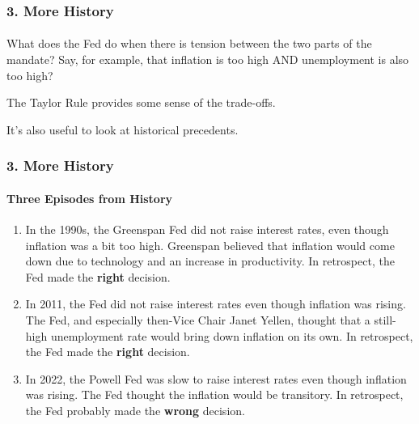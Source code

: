 \documentclass{beamer}
\begin{document}
\begin{frame}[t]
    \frametitle{3. More History}
    \framesubtitle{}

    What does the Fed do when there is tension between the two parts of the mandate?   Say, for example, that inflation is too high AND unemployment is also too high?  
    \vspace{1em}
    
    The Taylor Rule provides some sense of the trade-offs.
    \vspace{1em}
    
    It's also useful to look at historical precedents.

\end{frame}

\begin{frame}[t]
    \frametitle{3. More History}
    \framesubtitle{Three Episodes from History}

    \begin{enumerate}
        \item In the 1990s, the Greenspan Fed did not raise interest rates, even though inflation was a bit too high.   Greenspan  believed that inflation would come down due to technology and an increase in productivity.   In retrospect, the Fed made the \textbf{right} decision.
        \item In 2011, the Fed did not raise interest rates even though inflation was rising.   The Fed, and especially then-Vice Chair Janet Yellen, thought that a still-high unemployment rate would bring down inflation on its own.   In retrospect, the Fed made the \textbf{right} decision.
        \item In 2022, the Powell Fed was slow to raise interest rates even though inflation was rising.   The Fed thought the inflation would be transitory.   In retrospect, the Fed probably made the \textbf{wrong} decision.
    \end{enumerate}

\end{frame}
\end{document}
